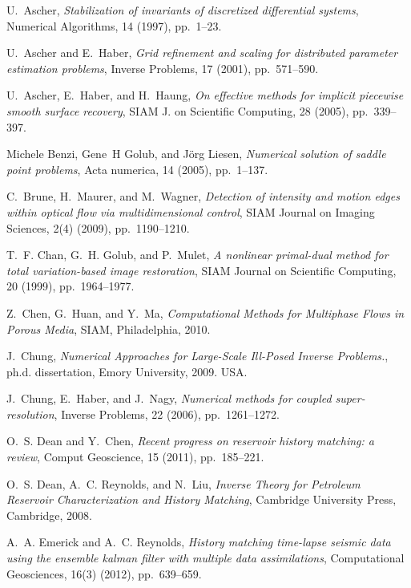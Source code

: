 \documentclass[english]{siamltex}
\begin{document}

\begin{thebibliography}{10}

{\sc U.~Ascher}, {\em Stabilization of invariants of discretized differential
  systems}, Numerical Algorithms, 14 (1997), pp.~1--23.

{\sc U.~Ascher and E.~Haber}, {\em Grid refinement and scaling for distributed
  parameter estimation problems}, Inverse Problems, 17 (2001), pp.~571--590.

{\sc U.~Ascher, E.~Haber, and H.~Haung}, {\em On effective methods for implicit
  piecewise smooth surface recovery}, SIAM J. on Scientific Computing, 28
  (2005), pp.~339--397.

{\sc Michele Benzi, Gene~H Golub, and J{\"o}rg Liesen}, {\em Numerical solution
  of saddle point problems}, Acta numerica, 14 (2005), pp.~1--137.

{\sc C.~Brune, H.~Maurer, and M.~Wagner}, {\em Detection of intensity and
  motion edges within optical flow via multidimensional control}, SIAM Journal
  on Imaging Sciences, 2(4) (2009), pp.~1190--1210.

{\sc T.~F. Chan, G.~H. Golub, and P.~Mulet}, {\em A nonlinear primal-dual
  method for total variation-based image restoration}, SIAM Journal on
  Scientific Computing, 20 (1999), pp.~1964--1977.

{\sc Z.~Chen, G.~Huan, and Y.~Ma}, {\em Computational Methods for Multiphase
  Flows in Porous Media}, SIAM, Philadelphia, 2010.

{\sc J.~Chung}, {\em Numerical Approaches for Large-Scale Ill-Posed Inverse
  Problems.}, ph.d. dissertation, Emory University, 2009.
\newblock USA.

{\sc J.~Chung, E.~Haber, and J.~Nagy}, {\em Numerical methods for coupled
  super-resolution}, Inverse Problems, 22 (2006), pp.~1261--1272.

{\sc O.~S. Dean and Y.~Chen}, {\em {Recent progress on reservoir history
  matching: a review}}, Comput Geoscience, 15 (2011), pp.~185--221.

{\sc O.~S. Dean, A.~C. Reynolds, and N.~Liu}, {\em Inverse Theory for Petroleum
  Reservoir Characterization and History Matching}, Cambridge University Press,
  Cambridge, 2008.

{\sc A.~A. Emerick and A.~C. Reynolds}, {\em History matching time-lapse
  seismic data using the ensemble kalman filter with multiple data
  assimilations}, Computational Geosciences, 16(3) (2012), pp.~639--659.


\end{thebibliography}
\end{document}
